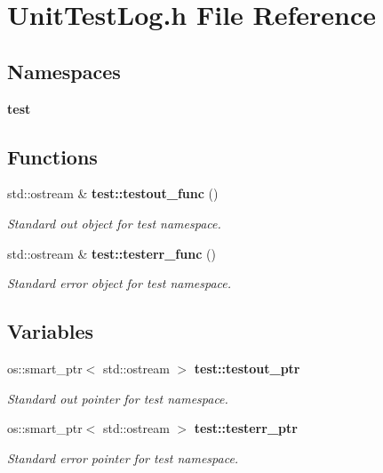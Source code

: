 \section{Unit\+Test\+Log.\+h File Reference}
\label{UnitTestLog_8h}
\subsection*{Namespaces}
\begin{DoxyCompactItemize}
\item 
 {\bf test}
\end{DoxyCompactItemize}
\subsection*{Functions}
\begin{DoxyCompactItemize}
\item 
std\+::ostream \& {\bf test\+::testout\+\_\+func} ()
\begin{DoxyCompactList}\small\item\em Standard out object for test namespace. \end{DoxyCompactList}\item 
std\+::ostream \& {\bf test\+::testerr\+\_\+func} ()
\begin{DoxyCompactList}\small\item\em Standard error object for test namespace. \end{DoxyCompactList}\end{DoxyCompactItemize}
\subsection*{Variables}
\begin{DoxyCompactItemize}
\item 
os\+::smart\+\_\+ptr$<$ std\+::ostream $>$ {\bf test\+::testout\+\_\+ptr}
\begin{DoxyCompactList}\small\item\em Standard out pointer for test namespace. \end{DoxyCompactList}\item 
os\+::smart\+\_\+ptr$<$ std\+::ostream $>$ {\bf test\+::testerr\+\_\+ptr}
\begin{DoxyCompactList}\small\item\em Standard error pointer for test namespace. \end{DoxyCompactList}\end{DoxyCompactItemize}

